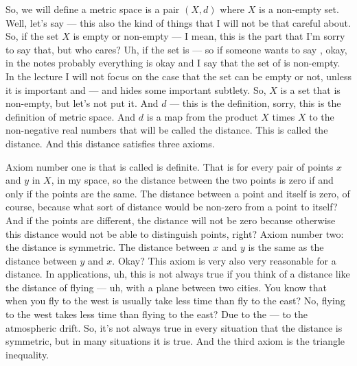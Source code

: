 \begin{spoken-clean}[00:12:50 - 00:15:15]
So, we will define a metric space is a pair $(X, d)$ where $X$ is a non-empty set. Well, let's say --- this also the kind of things that I will not be that careful about. So, if the set $X$ is empty or non-empty --- I mean, this is the part that I'm sorry to say that, but who cares? Uh, if the set is --- so if someone wants to say , okay, in the notes probably everything is okay and I say that the set of is non-empty. In the lecture I will not focus on the case that the set can be empty or not, unless it is important and --- and hides some important subtlety. So, $X$ is a set that is non-empty, but let's not put it. And $d$ --- this is the definition, sorry, this is the definition of metric space. And $d$ is a map from the product $X$ times $X$ to the non-negative real numbers that will be called the distance. This is called the distance. And this distance satisfies three axioms.

Axiom number one is that is called is definite. That is for every pair of points $x$ and $y$ in $X$, in my space, so the distance between the two points is zero if and only if the points are the same. The distance between a point and itself is zero, of course, because what sort of distance would be non-zero from a point to itself? And if the points are different, the distance will not be zero because otherwise this distance would not be able to distinguish points, right? Axiom number two: the distance is symmetric. The distance between $x$ and $y$ is the same as the distance between $y$ and $x$. Okay? This axiom is very also very reasonable for a distance. In applications, uh, this is not always true if you think of a distance like the distance of flying --- uh, with a plane between two cities. You know that when you fly to the west is usually take less time than fly to the east? No, flying to the west takes less time than flying to the east? Due to the --- to the atmospheric drift. So, it's not always true in every situation that the distance is symmetric, but in many situations it is true. And the third axiom is the triangle inequality.
\end{spoken-clean}

